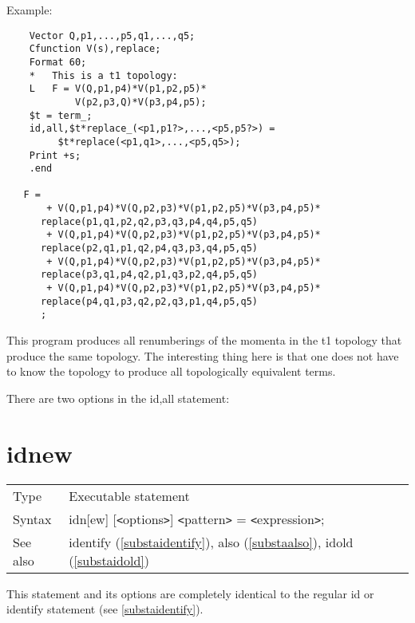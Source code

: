 \noindent Example:
\begin{verbatim}
    Vector Q,p1,...,p5,q1,...,q5;
    Cfunction V(s),replace;
    Format 60;
    *   This is a t1 topology:
    L   F = V(Q,p1,p4)*V(p1,p2,p5)*
            V(p2,p3,Q)*V(p3,p4,p5);
    $t = term_;
    id,all,$t*replace_(<p1,p1?>,...,<p5,p5?>) =
         $t*replace(<p1,q1>,...,<p5,q5>);
    Print +s;
    .end

   F =
       + V(Q,p1,p4)*V(Q,p2,p3)*V(p1,p2,p5)*V(p3,p4,p5)*
      replace(p1,q1,p2,q2,p3,q3,p4,q4,p5,q5)
       + V(Q,p1,p4)*V(Q,p2,p3)*V(p1,p2,p5)*V(p3,p4,p5)*
      replace(p2,q1,p1,q2,p4,q3,p3,q4,p5,q5)
       + V(Q,p1,p4)*V(Q,p2,p3)*V(p1,p2,p5)*V(p3,p4,p5)*
      replace(p3,q1,p4,q2,p1,q3,p2,q4,p5,q5)
       + V(Q,p1,p4)*V(Q,p2,p3)*V(p1,p2,p5)*V(p3,p4,p5)*
      replace(p4,q1,p3,q2,p2,q3,p1,q4,p5,q5)
      ;
\end{verbatim}
This program produces all renumberings of the momenta in the t1 topology 
that produce the same topology. The interesting thing here is that one does 
not have to know the topology to produce all topologically equivalent 
terms.

There are two options in the id,all statement: \hfill \\
\vspace{10mm}


\section{idnew}
\label{substaidnew}

\noindent \begin{tabular}{ll}
Type & Executable statement\\
Syntax & idn[ew] [{\tt<}options{\tt>}] {\tt<}pattern{\tt>} = {\tt<}expression{\tt>};
\\ See also & identify (\ref{substaidentify}),
              also (\ref{substaalso}),
              idold (\ref{substaidold})
\end{tabular} \vspace{4mm}

\noindent This statement and its options are completely 
identical to the regular id or identify statement 
(see \ref{substaidentify}). \vspace{10mm}

